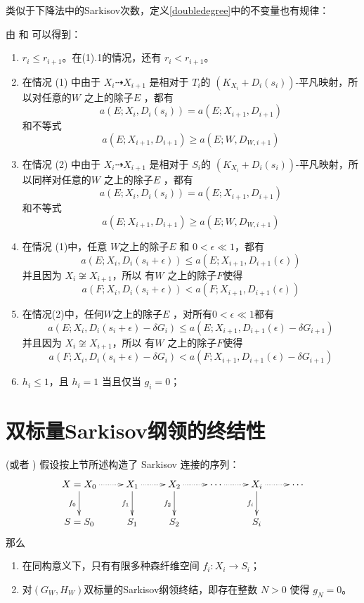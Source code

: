 类似于下降法中的Sarkisov次数，定义\ref{doubledegree}中的不变量也有规律：
\begin{assertion}\label{behavior2}
  由 \cite[Lemma 13.14-17]{haconMinimalModelProgram2012} 和 \cite[Lemma 4.2]{liuSarkisovProgramGeneralized2021}可以得到：
  \begin{enumerate}
    \item $r_{i}\leqslant r_{i+1}$。在(1).1的情况，还有 $r_{i}<r_{i+1}$。
    \item 在情况 (1) 中由于 $X_{i}\dashrightarrow X_{i+1}$ 是相对于 $T_{i}$的 $(K_{X_{i}}+D_{i}(s_{i}))$-平凡映射，所以对任意的$W$ 之上的除子$E$ ，都有
      \[a(E;X_{i},D_{i}(s_{i}))= a(E;X_{i+1},D_{i+1})\]
      和不等式
      \[ a(E;X_{i+1},D_{i+1})\geqslant a(E;W,D_{W,i+1}) \]
    \item 在情况 (2) 中由于 $X_{i}\dashrightarrow X_{i+1}$ 是相对于 $S_{i}$的 $(K_{X_{i}}+D_{i}(s_{i}))$-平凡映射，所以同样对任意的$W$ 之上的除子$E$ ，都有
      \[a(E;X_{i},D_{i}(s_{i}))= a(E;X_{i+1},D_{i+1})\]
      和不等式
      \[ a(E;X_{i+1},D_{i+1})\geqslant a(E;W,D_{W,i+1}) \]
    \item\label{2adicrepancy} 在情况 (1)中，任意 $W$之上的除子$E$ 和 $0<\epsilon\ll 1$，都有
      \[a(E;X_{i},D_{i}(s_{i}+\epsilon))\leqslant a(E;X_{i+1},D_{i+1}(\epsilon))\] 
      并且因为 $X_{i} \not\cong X_{i+1}$，所以 有$W$ 之上的除子$F$使得 
      \[a(F;X_{i},D_{i}(s_{i}+\epsilon))< a(F;X_{i+1},D_{i+1}(\epsilon))\]
    \item\label{2bdiscrepancy} 在情况(2)中，任何$ W$之上的除子$E$ ，对所有$0<\epsilon\ll 1$都有
      \[a(E;X_{i},D_{i}(s_{i}+\epsilon)-\delta G_{i})\leqslant a(E;X_{i+1},D_{i+1}(\epsilon)-\delta G_{i+1})\]
      并且因为 $X_{i} \not\cong X_{i+1}$，所以 有$W$ 之上的除子$F$使得 
      \[a(F;X_{i},D_{i}(s_{i}+\epsilon)-\delta G_{i})< a(F;X_{i+1},D_{i+1}(\epsilon)-\delta G_{i+1}) \]
    \item  $h_{i}\leqslant 1$，且 $h_{i}=1$ 当且仅当 $g_{i}=0$；
  \end{enumerate}
\end{assertion}

\section{双标量Sarkisov纲领的终结性}
\begin{lemma}\label{termination2}
  \cite[Lemma 13.18-19]{haconMinimalModelProgram2012} (或者 \cite[Lemma 4.9]{liuSarkisovProgramGeneralized2021}) 假设按上节所述构造了 Sarkisov 连接的序列：
  \[ \xymatrix{
    X=X_0\ar@{.>}[r]\ar[d]_{f_0}&X_{1}\ar@{.>}[r]\ar[d]_{f_1}& X_{2}\ar[d]_{f_2}\ar@{.>}[r] &\cdots\ar@{.>}[r]&X_{i}\ar[d]_{f_i}\ar@{.>}[r] &\cdots\\
    S=S_{0}&S_{1} &S_{2}&&S_{i}
    } \]
  那么
  \begin{enumerate}
    \item 在同构意义下，只有有限多种森纤维空间 $f_{i}:X_{i}\to S_{i}$；
    \item 对$(G_{W},H_{W})$双标量的Sarkisov纲领终结，即存在整数 $N>0$ 使得 $g_{N}=0$。
  \end{enumerate}
\end{lemma}

